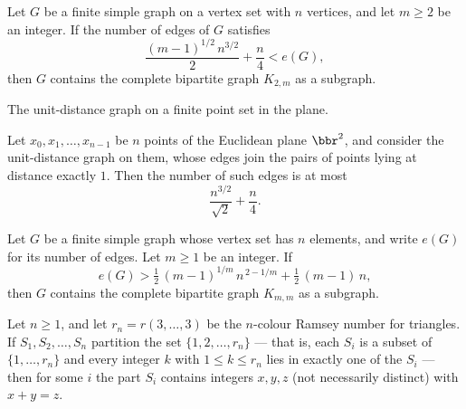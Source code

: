 \begin{theorem}
\label{SimpleGraph.isContained_completeBipartite_two_of_card_edgeFinset_gt}
Let $G$ be a finite simple graph on a vertex set with $n$ vertices, and let $m \ge 2$ be
an integer. If the number of edges of $G$ satisfies
\[
\frac{(m-1)^{1/2}\, n^{3/2}}{2} + \frac{n}{4} < e(G),
\]
then $G$ contains the complete bipartite graph $K_{2,m}$ as a subgraph.
\end{theorem}

\begin{definition}
\label{SimpleGraph.unitDistanceGraph}
The unit-distance graph on a finite point set in the plane.
\end{definition}

\begin{theorem}
\label{SimpleGraph.card_unit_distance_pairs_le}
Let $x_0, x_1, \dots, x_{n-1}$ be $n$ points of the Euclidean plane $\bbr^2$, and
consider the unit-distance graph on them, whose edges join the pairs of points lying at
distance exactly $1$. Then the number of such edges is at most
\[
\frac{n^{3/2}}{\sqrt{2}} + \frac{n}{4}.
\]
\end{theorem}

\begin{theorem}
\label{SimpleGraph.isContained_completeBipartite_of_card_edgeFinset_gt}
Let $G$ be a finite simple graph whose vertex set has $n$ elements, and write $e(G)$ for
its number of edges. Let $m \ge 1$ be an integer. If
\[
e(G) > \tfrac{1}{2}\,(m-1)^{1/m}\, n^{\,2 - 1/m} + \tfrac{1}{2}\,(m-1)\, n,
\]
then $G$ contains the complete bipartite graph $K_{m,m}$ as a subgraph.
\end{theorem}

\begin{theorem}[Schur's theorem on monochromatic solutions of x + y = z]
\label{SimpleGraph.schur}
Let $n \ge 1$, and let $r_n = r(3,\ldots,3)$ be the $n$-colour Ramsey number for
triangles. If $S_1, S_2, \ldots, S_n$ partition the set $\{1, 2, \ldots, r_n\}$ — that
is, each $S_i$ is a subset of $\{1, \ldots, r_n\}$ and every integer $k$ with $1 \le k
\le r_n$ lies in exactly one of the $S_i$ — then for some $i$ the part $S_i$ contains
integers $x, y, z$ (not necessarily distinct) with $x + y = z$.
\end{theorem}

